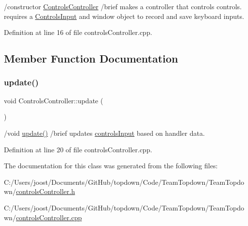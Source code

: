 /constructor \hyperlink{class_controls_controller}{Controls\+Controller} /brief makes a controller that controls controls. requires a \hyperlink{struct_controls_input}{Controls\+Input} and window object to record and save keyboard inputs. 

Definition at line 16 of file controls\+Controller.\+cpp.



\subsection{Member Function Documentation}
\mbox{\label{class_controls_controller_a29b1ad7f93658a74035900645d59d9f7}} 
\subsubsection{\texorpdfstring{update()}{update()}}
{\footnotesize\ttfamily void Controls\+Controller\+::update (\begin{DoxyParamCaption}{ }\end{DoxyParamCaption})}

/void \hyperlink{class_controls_controller_a29b1ad7f93658a74035900645d59d9f7}{update()} /brief updates \hyperlink{classcontrols_input}{controls\+Input} based on handler data. 

Definition at line 20 of file controls\+Controller.\+cpp.



The documentation for this class was generated from the following files\+:\begin{DoxyCompactItemize}
\item 
C\+:/\+Users/joost/\+Documents/\+Git\+Hub/topdown/\+Code/\+Team\+Topdown/\+Team\+Topdown/\hyperlink{controls_controller_8h}{controls\+Controller.\+h}\item 
C\+:/\+Users/joost/\+Documents/\+Git\+Hub/topdown/\+Code/\+Team\+Topdown/\+Team\+Topdown/\hyperlink{controls_controller_8cpp}{controls\+Controller.\+cpp}\end{DoxyCompactItemize}
